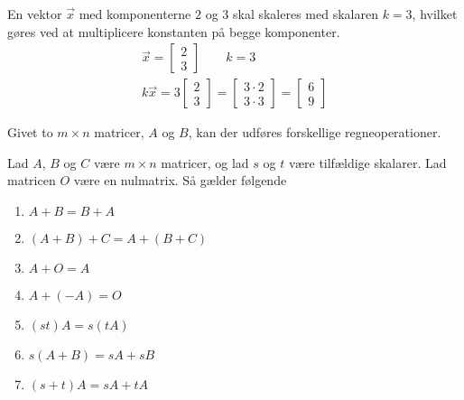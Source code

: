 \begin{eks}
En vektor $\vec{x}$ med komponenterne $2$ og $3$ skal skaleres med skalaren $k=3$, hvilket gøres ved at multiplicere konstanten på begge komponenter.
\begin{align*}
\vec{x}=\begin{bmatrix}
2\\
3
\end{bmatrix}\qquad k=3\\
k\vec{x}=3
\begin{bmatrix}
2\\
3
\end{bmatrix}
=
\begin{bmatrix}
3\cdot2\\
3\cdot3
\end{bmatrix}
=
\begin{bmatrix}
6\\
9
\end{bmatrix}
\end{align*}
\end{eks}


Givet to $m \times n$ matricer, $A$ og $B$, kan der udføres forskellige regneoperationer. \\

\begin{stn}
Lad $A$, $B$ og $C$ være $m \times n$ matricer, og lad $s$ og $t$ være tilfældige skalarer. Lad matricen $O$ være en nulmatrix.
Så gælder følgende
\begin{enumerate}[label=(\alph*)]
\item $A + B = B + A$
\item $(A + B) + C = A + (B + C)$
\item $A + O = A$
\item $A + (-A) = O$
\item $(st) A = s (tA)$
\item $s(A + B) = sA + sB$
\item $(s+t)A = sA + tA$
\end{enumerate}
\label{stn_regn}
\end{stn}

